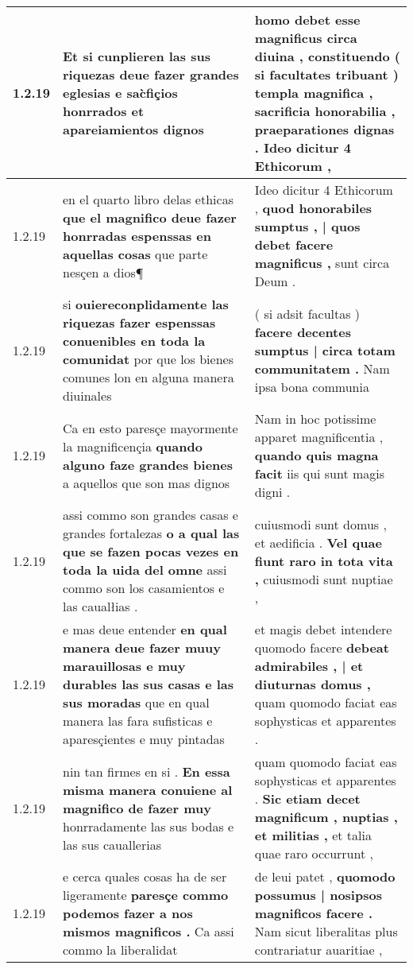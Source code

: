 \begin{tabular}{|p{1cm}|p{6.5cm}|p{6.5cm}|}
1.2.19 & Et si cunplieren las sus riquezas \textbf{ deue fazer grandes eglesias e sac̀fiçios honrrados } et apareiamientos dignos & homo debet esse magnificus circa diuina , \textbf{ constituendo ( si facultates tribuant ) templa magnifica , sacrificia honorabilia , praeparationes dignas . } Ideo dicitur 4 Ethicorum , \\\hline
1.2.19 & en el quarto libro delas ethicas \textbf{ que el magnifico deue fazer honrradas espenssas en aquellas cosas } que parte nesçen a dios¶ & Ideo dicitur 4 Ethicorum , \textbf{ quod honorabiles sumptus , | quos debet facere magnificus , } sunt circa Deum . \\\hline
1.2.19 & si \textbf{ ouiereconplidamente las riquezas fazer espenssas conuenibles en toda la comunidat } por que los bienes comunes lon en alguna manera diuinales & ( si adsit facultas ) \textbf{ facere decentes sumptus | circa totam communitatem . } Nam ipsa bona communia \\\hline
1.2.19 & Ca en esto paresçe mayormente la magnificençia \textbf{ quando alguno faze grandes bienes } a aquellos que son mas dignos & Nam in hoc potissime apparet magnificentia , \textbf{ quando quis magna facit } iis qui sunt magis digni . \\\hline
1.2.19 & assi commo son grandes casas e grandes fortalezas \textbf{ o a qual las que se fazen pocas vezes en toda la uida del omne } assi commo son los casamientos e las caualłias . & cuiusmodi sunt domus , et aedificia . \textbf{ Vel quae fiunt raro in tota vita , } cuiusmodi sunt nuptiae , \\\hline
1.2.19 & e mas deue entender \textbf{ en qual manera deue fazer muuy marauillosas e muy durables las sus casas e las sus moradas } que en qual manera las fara sufisticas e aparesçientes e muy pintadas & et magis debet intendere quomodo facere \textbf{ debeat admirabiles , | et diuturnas domus , } quam quomodo faciat eas sophysticas et apparentes . \\\hline
1.2.19 & nin tan firmes en si . \textbf{ En essa misma manera conuiene al magnifico de fazer muy } honrradamente las sus bodas e las sus cauallerias & quam quomodo faciat eas sophysticas et apparentes . \textbf{ Sic etiam decet magnificum , nuptias , et militias , } et talia quae raro occurrunt , \\\hline
1.2.19 & e cerca quales cosas ha de ser ligeramente \textbf{ paresçe commo podemos fazer a nos mismos magnificos . } Ca assi commo la liberalidat & de leui patet , \textbf{ quomodo possumus | nosipsos magnificos facere . } Nam sicut liberalitas plus contrariatur auaritiae , \\\hline

\end{tabular}
